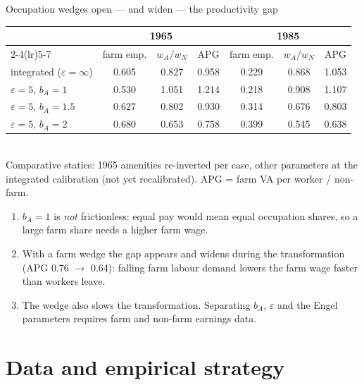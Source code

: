 \documentclass[10pt,aspectratio=169]{beamer}
\newcommand{\hl}[1]{\textcolor{mOrange}{#1}}
\begin{document}
\begin{frame}{Occupation wedges open --- and widen --- the productivity gap}
  \footnotesize
  \centering
  \begin{tabular}{@{}lcccccc@{}}
    \toprule
    & \multicolumn{3}{c}{1965} & \multicolumn{3}{c}{1985} \\
    \cmidrule(lr){2-4}\cmidrule(lr){5-7}
    & farm emp. & $w_A/w_N$ & APG & farm emp. & $w_A/w_N$ & APG \\
    \midrule
    integrated ($\varepsilon=\infty$) & 0.605 & 0.827 & 0.958 & 0.229 & 0.868 & 1.053 \\
    $\varepsilon=5$, $b_A=1$ & 0.530 & 1.051 & 1.214 & 0.218 & 0.908 & 1.107 \\
    $\varepsilon=5$, $b_A=1.5$ & 0.627 & 0.802 & 0.930 & 0.314 & 0.676 & 0.803 \\
    $\varepsilon=5$, $b_A=2$ & 0.680 & 0.653 & \hl{0.758} & 0.399 & 0.545 & \hl{0.638} \\
    \bottomrule
  \end{tabular}\\[0.2em]
  \tiny Comparative statics: 1965 amenities re-inverted per case, other parameters at the
  integrated calibration (not yet recalibrated). APG = farm VA per worker / non-farm.
  \vspace{0.5em}
  \begin{enumerate}\small
    \item $b_A=1$ is \emph{not} frictionless: equal pay would mean equal occupation shares,
          so a large farm share needs a higher farm wage.
    \item With a farm wedge the gap \hl{appears and widens} during the transformation
          (APG 0.76 $\to$ 0.64): falling farm labour demand lowers the farm wage faster than
          workers leave.
    \item The wedge also \hl{slows} the transformation. Separating $b_A$, $\varepsilon$ and
          the Engel parameters requires farm and non-farm earnings data.
  \end{enumerate}
\end{frame}

\section{Data and empirical strategy}
\end{document}
